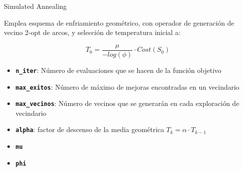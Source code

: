 \documentclass[ignorenonframetext,]{beamer}
\begin{document}
\begin{frame}{Simulated Annealing}

Emplea esquema de enfriamiento geométrico, con operador de generación de
vecino 2-opt de arcos, y selección de temperatura inicial a:

\[T_0 = \frac{\mu}{-log(\phi)} \cdot Cost(S_0)  \]

\begin{itemize}
\item
  \textbf{\texttt{n\_iter}}: Número de evaluaciones que se hacen de la
  función objetivo
\item
  \textbf{\texttt{max\_exitos}}: Número de máximo de mejoras encontradas
  en un vecindario
\item
  \textbf{\texttt{max\_vecinos}}: Número de vecinos que se generarán en
  cada exploración de vecindario
\item
  \textbf{\texttt{alpha}}: factor de descenso de la media geométrica
  $T_k = \alpha \cdot T_{k-1}$
\item
  \textbf{\texttt{mu}}
\item
  \textbf{\texttt{phi}}
\end{itemize}

\end{frame}
\end{document}
